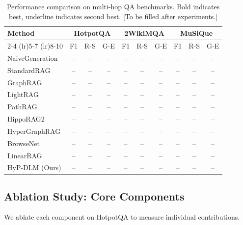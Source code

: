 \documentclass[11pt,a4paper]{article}
\begin{document}
\begin{table}[ht]
\centering
\caption{Performance comparison on multi-hop QA benchmarks. Bold indicates best, underline indicates second best. [To be filled after experiments.]}
\label{tab:main}
\begin{tabular}{l ccc ccc ccc}
\toprule
\multirow{2}{*}{Method} & \multicolumn{3}{c}{HotpotQA} & \multicolumn{3}{c}{2WikiMQA} & \multicolumn{3}{c}{MuSiQue} \\
\cmidrule(lr){2-4} \cmidrule(lr){5-7} \cmidrule(lr){8-10}
 & F1 & R-S & G-E & F1 & R-S & G-E & F1 & R-S & G-E \\
\midrule
NaiveGeneration & -- & -- & -- & -- & -- & -- & -- & -- & -- \\
StandardRAG & -- & -- & -- & -- & -- & -- & -- & -- & -- \\
GraphRAG & -- & -- & -- & -- & -- & -- & -- & -- & -- \\
LightRAG & -- & -- & -- & -- & -- & -- & -- & -- & -- \\
PathRAG & -- & -- & -- & -- & -- & -- & -- & -- & -- \\
HippoRAG2 & -- & -- & -- & -- & -- & -- & -- & -- & -- \\
HyperGraphRAG & -- & -- & -- & -- & -- & -- & -- & -- & -- \\
BrowseNet & -- & -- & -- & -- & -- & -- & -- & -- & -- \\
LinearRAG & -- & -- & -- & -- & -- & -- & -- & -- & -- \\
\midrule
HyP-DLM (Ours) & -- & -- & -- & -- & -- & -- & -- & -- & -- \\
\bottomrule
\end{tabular}
\end{table}

\subsection{Ablation Study: Core Components}

We ablate each component on HotpotQA to measure individual contributions.
\end{document}
